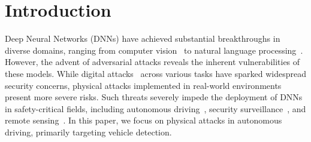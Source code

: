 \documentclass[10pt,journal,compsoc]{IEEEtran}
\begin{document}
\maketitle


\IEEEdisplaynontitleabstractindextext



%
\IEEEpeerreviewmaketitle

% 
% 
\section{Introduction}
\label{sec:intro}
Deep Neural Networks (DNNs) have achieved substantial breakthroughs in diverse domains, ranging from computer vision~\cite{he2016resnet} to natural language processing~\cite{vaswani2017attention, fan2023advances}.
However, the advent of adversarial attacks reveals the inherent vulnerabilities of these models. 
While digital attacks~\cite{goodfellow2014FGSM, gu2023survey, carlini2017cw,jia2020adv,he2023generating,lou2024hitadv,jia2025adversarial, muxue2023adversarial,jia2024semantic} across various tasks have sparked widespread security concerns, physical attacks implemented in real-world environments present more severe risks. 
Such threats severely impede the deployment of DNNs in safety-critical fields, including autonomous driving~\cite{wang2023does, cao2023you, deng2020analysis}, security surveillance~\cite{nguyen2023physical, wang2019advpattern, liang2021generate, liang2020efficient, wei2018transferable, liang2022parallel, liang2022large, kong2024patch, liang2024object, kong2024environmental}, and remote sensing~\cite{wang2024fooling, lian2022benchmarking, liu2023x}.
In this paper, we focus on physical attacks in autonomous driving, primarily targeting vehicle detection.
\end{document}
